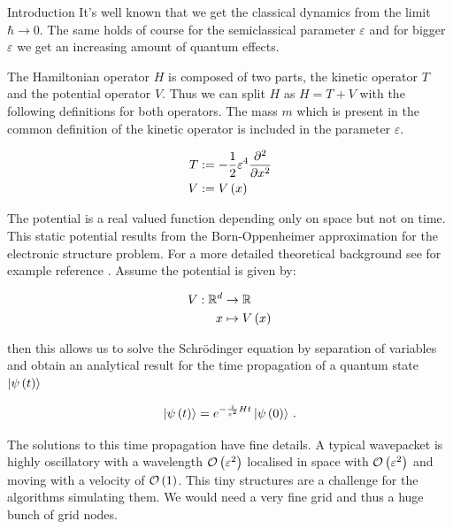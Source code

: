 \begin{chapter}{Introduction}
It's well known that we get the classical dynamics from the limit $\hbar \rightarrow 0$.
The same holds of course for the semiclassical parameter $\varepsilon$ and for bigger
$\varepsilon$ we get an increasing amount of quantum effects.

The Hamiltonian operator $H$ is composed of two parts, the kinetic operator $T$
and the potential operator $V$. Thus we can split $H$ as $H = T + V$ with the
following definitions for both operators. The mass $m$ which is present in the
common definition of the kinetic operator is included in the parameter $\varepsilon$.

\begin{equation} \label{eq:basics_def_ops}
\begin{split}
  T & := - \frac{1}{2} \varepsilon^4 \frac{\partial^2}{\partial x^2} \\
  V & := V\left( x \right)
\end{split}
\end{equation}

The potential is a real valued function depending only on space but not on time.
This static potential results from the Born-Oppenheimer approximation for
the electronic structure problem. For a more detailed theoretical background see
for example reference \cite{S_Teufel}. Assume the potential is given by:

\begin{equation} \label{eq:basics_potential_function}
\begin{split}
  V : \mathbb{R}^d & \rightarrow \mathbb{R} \\
                 x & \mapsto V\left( x \right)
\end{split}
\end{equation}

then this allows us to solve the Schrödinger equation by separation of variables
and obtain an analytical result for the time propagation of a quantum state $\Ket{\psi\left( t \right)}$

\begin{equation} \label{eq:basics_analytic_time_propagation}
  \Ket{\psi\left( t \right)} = e^{- \frac{i}{\varepsilon^2} H t } \Ket{\psi\left( 0 \right)} \,.
\end{equation}

The solutions to this time propagation have fine details. A typical wavepacket
is highly oscillatory with a wavelength $\mathcal{O}\left( \varepsilon^2 \right)$ localised in space
with $\mathcal{O}\left( \varepsilon^2 \right)$ and moving with a velocity of $\mathcal{O}\left( 1 \right)$. This tiny
structures are a challenge for the algorithms simulating them. We would need a very
fine grid and thus a huge bunch of grid nodes.



\end{chapter}
